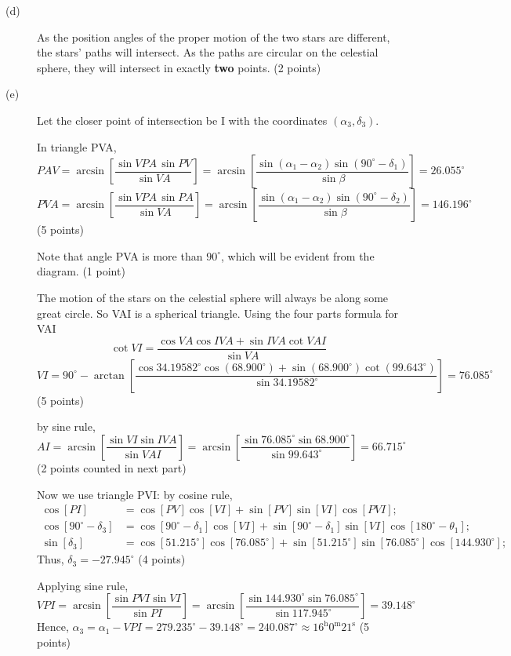 \begin{description}
\item[(d)] As the position angles of the proper motion of the two stars are
  different, the stars' paths will intersect. As the paths are circular on
  the celestial sphere, they will intersect in exactly \textbf{two} points.
  \hfill(2 points)

\item[(e)] Let the closer point of intersection be I with the coordinates
  $(\alpha_3, \delta_3)$.

  In triangle PVA,
  \[ PAV = \arcsin\left[\frac{\sin VPA\,\sin PV}{\sin VA}\right]
     = \arcsin\left[\frac{\sin(\alpha_1 - \alpha_2)
       \sin(90^\circ - \delta_1)}{\sin\beta}\right] = 26.055^\circ \]
  \[ PVA = \arcsin\left[\frac{\sin VPA\,\sin PA}{\sin VA}\right]
     = \arcsin\left[\frac{\sin(\alpha_1 - \alpha_2)
       \sin(90^\circ - \delta_2)}{\sin\beta}\right] = 146.196^\circ \]
  \hfill(5 points)

  Note that angle PVA is more than $90^\circ$, which will be evident from
  the diagram. \hfill(1 point)

  The motion of the stars on the celestial sphere will always be along some
  great circle. So VAI is a spherical triangle. Using the four parts formula
  for VAI
  \[ \cot VI = \frac{\cos VA\cos IVA + \sin IVA\cot VAI}{\sin VA} \]
  \[ VI = 90^\circ - \arctan\left[\frac{\cos 34.19582^\circ
     \cos(68.900^\circ) + \sin(68.900^\circ)\cot(99.643^\circ)}
     {\sin 34.19582^\circ}\right] = 76.085^\circ \]
  \hfill(5 points)

  by sine rule,
  \[ AI = \arcsin\left[\frac{\sin VI\sin IVA}{\sin VAI}\right]
     = \arcsin\left[\frac{\sin 76.085^\circ\sin 68.900^\circ}
       {\sin 99.643^\circ}\right] = 66.715^\circ \]
  \hfill(2 points counted in next part)

  Now we use triangle PVI: by cosine rule,
  \begin{align*}
  \cos[PI] &= \cos[PV]\cos[VI] + \sin[PV]\sin[VI]\cos[PVI];\\
  \cos[90^\circ - \delta_3] &= \cos[90^\circ - \delta_1]\cos[VI]
    + \sin[90^\circ - \delta_1]\sin[VI]\cos[180^\circ - \theta_1];\\
  \sin[\delta_3] &= \cos[51.215^\circ]\cos[76.085^\circ]
    + \sin[51.215^\circ]\sin[76.085^\circ]\cos[144.930^\circ];
  \end{align*}
  Thus, $\delta_3 = -27.945^\circ$ \hfill(4 points)

  Applying sine rule,
  \[ VPI = \arcsin\left[\frac{\sin PVI\sin VI}{\sin PI}\right]
     = \arcsin\left[\frac{\sin 144.930^\circ\sin 76.085^\circ}
       {\sin 117.945^\circ}\right] = 39.148^\circ \]
  Hence,
  $\alpha_3 = \alpha_1 - VPI = 279.235^\circ - 39.148^\circ = 240.087^\circ
   \approx 16^{\mathrm{h}}0^{\mathrm{m}}21^{\mathrm{s}}$ \hfill(5 points)


\end{description}
